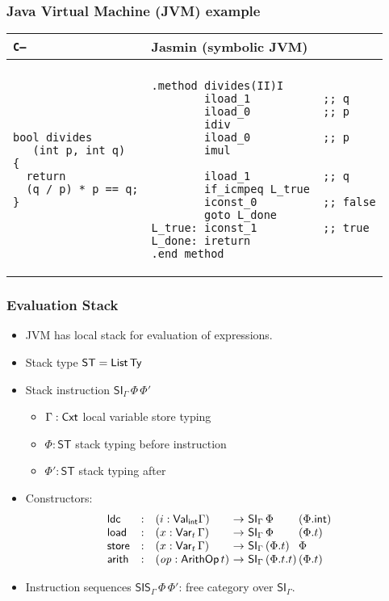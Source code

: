 \documentclass[t,fleqn,usenames,dvipsnames]{beamer}
\newcommand{\tVal}{\mathsf{Val}}
\newcommand{\Val}[1][]{\tVal_{#1}}
\newcommand{\Var}[2][]{\mathsf{Var}_{#1}\,#2}
\newcommand{\vop}{\mathit{op}}
\newcommand{\tarith}{\mathsf{arith}}
\newcommand{\tArithOp}{\mathsf{ArithOp}}
\newcommand{\ArithOp}[1]{\tArithOp\,#1}
\newcommand{\tldc}{\mathsf{ldc}}
\newcommand{\tload}{\mathsf{load}}
\newcommand{\tstore}{\mathsf{store}}
\newcommand{\tint}{\mathsf{int}}
\newcommand{\ST}{\mathsf{ST}}
\newcommand{\tSI}{\mathsf{SI}}
\newcommand{\SI}[3][]{\tSI_{#1}\,#2\,#3}
\newcommand{\tSIs}{\mathsf{SIS}}
\newcommand{\SIs}[3][]{\tSIs_{#1}\,#2\,#3}
\newcommand{\Cmm}{\texttt{C--}\xspace}
\begin{document}
\begin{frame}[fragile]%
  \frametitle{Java Virtual Machine (JVM) example}
  \vspace{-1ex}
  \begin{tabular}{l@{\qquad}l}
  \Cmm & Jasmin (symbolic JVM) \\
\hline
\\[-1ex]
    \begin{minipage}[t]{0.3\linewidth}
\begin{verbatim}
bool divides
   (int p, int q)
{
  return
  (q / p) * p == q;
}
\end{verbatim}
    \end{minipage}
& %
  \begin{minipage}[t]{0.5\linewidth}
\begin{verbatim}
.method divides(II)I
        iload_1           ;; q
        iload_0           ;; p
        idiv
        iload_0           ;; p
        imul

        iload_1           ;; q
        if_icmpeq L_true
        iconst_0          ;; false
        goto L_done
L_true: iconst_1          ;; true
L_done: ireturn
.end method
\end{verbatim}
  \end{minipage}
  \end{tabular}
\end{frame}


\begin{frame}%
  \frametitle{Evaluation Stack}
  \vspace{-3ex}
  \begin{itemize}
  \item JVM has local stack for evaluation of expressions.
  \item Stack type $\ST = \List\,\Ty$
  \item Stack instruction $\SI[\Gamma]\Phi{\Phi'}$
    \begin{itemize}
    \item $\Gamma : \mathsf{Cxt}$ local variable store typing
    \item $\Phi   : \ST$ stack typing before instruction
    \item $\Phi'  : \ST$ stack typing after
    \end{itemize}
  \item Constructors:
\[
\begin{array}{lcl@{~}c@{~}l@{}l}
  \tldc & : & (i : \Val[\tint]\Gamma) & \to & \SI[\Gamma]\Phi{&(\Phi.\tint)} \\
  \tload & : & (x : \Var[t]\Gamma) & \to & \SI[\Gamma]\Phi{&(\Phi.t)} \\
  \tstore & : & (x : \Var[t]\Gamma) & \to & \SI[\Gamma]{(\Phi.t)}{&\Phi} \\
  \tarith & : & (\vop : \ArithOp t) & \to & \SI[\Gamma]{(\Phi.t.t)}{&(\Phi.t)}
\end{array}
\]
  \item Instruction sequences $\SIs[\Gamma]\Phi{\Phi'}$: free category over $\tSI_\Gamma$.
  \end{itemize}
\end{frame}
\end{document}
